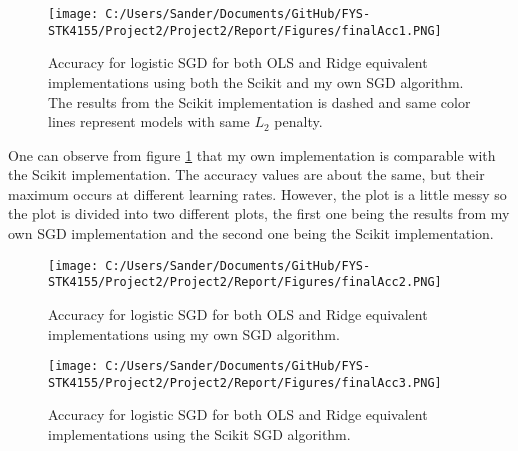 \documentclass[12pt,a4paper]{article}
\begin{document}
\begin{figure}[H]
\centering
\texttt{[image: C:/Users/Sander/Documents/GitHub/FYS-STK4155/Project2/Project2/Report/Figures/finalAcc1.PNG]}
\caption{\label{fig:finalAcc1} Accuracy for logistic SGD for both OLS and Ridge equivalent implementations using both the Scikit and my own SGD algorithm. The results from the Scikit implementation is dashed and same color lines represent models with same $L_2$ penalty.}
\end{figure}

\noindent One can observe from figure \ref{fig:finalAcc1} that my own implementation is comparable with the Scikit implementation. The accuracy values are about the same, but their maximum occurs at different learning rates. However, the plot is a little messy so the plot is divided into two different plots, the first one being the results from my own SGD implementation and the second one being the Scikit implementation.

\begin{figure}[H]
\centering
\texttt{[image: C:/Users/Sander/Documents/GitHub/FYS-STK4155/Project2/Project2/Report/Figures/finalAcc2.PNG]}
\caption{\label{fig:finalAcc2} Accuracy for logistic SGD for both OLS and Ridge equivalent implementations using my own SGD algorithm.}
\end{figure}

\begin{figure}[H]
\centering
\texttt{[image: C:/Users/Sander/Documents/GitHub/FYS-STK4155/Project2/Project2/Report/Figures/finalAcc3.PNG]}
\caption{\label{fig:finalAcc3} Accuracy for logistic SGD for both OLS and Ridge equivalent implementations using the Scikit SGD algorithm.}
\end{figure}
\end{document}
